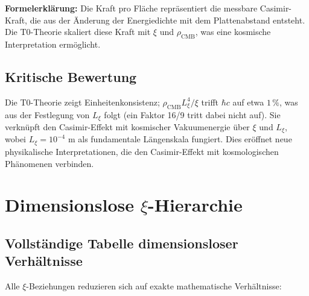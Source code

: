	\textbf{Formelerklärung:} Die Kraft pro Fläche repräsentiert die messbare Casimir-Kraft, die aus der Änderung der Energiedichte mit dem Plattenabstand entsteht. Die T0-Theorie skaliert diese Kraft mit $\xi$ und $\rho_{\text{CMB}}$, was eine kosmische Interpretation ermöglicht.
	
	\subsection{Kritische Bewertung}
	Die T0-Theorie zeigt Einheitenkonsistenz; $\rho_{\text{CMB}} L_\xi^4/\xi$ trifft $\hbar c$ auf etwa $1\,\%$, was aus der Festlegung von $L_\xi$ folgt (ein Faktor 16/9 tritt dabei nicht auf). Sie verknüpft den Casimir-Effekt mit kosmischer Vakuumenergie über $\xi$ und $L_\xi$, wobei $L_\xi = 10^{-4}$ m als fundamentale Längenskala fungiert. Dies eröffnet neue physikalische Interpretationen, die den Casimir-Effekt mit kosmologischen Phänomenen verbinden.
	
	\section{Dimensionslose $\xi$-Hierarchie}
	
	\subsection{Vollständige Tabelle dimensionsloser Verhältnisse}
	
	Alle $\xi$-Beziehungen reduzieren sich auf exakte mathematische Verhältnisse:
	
	\begin{table}[htbp]
		\centering
		\caption{Dimensionslose $\xi$-Verhältnisse in der T0-Theorie}
	\end{table}
	
